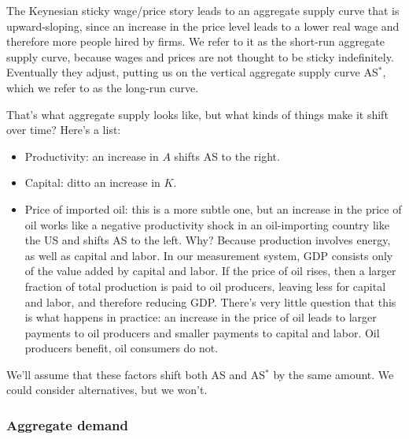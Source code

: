\documentclass[letterpaper,12pt]{article}
\begin{document}


The Keynesian sticky wage/price story leads to 
an aggregate supply curve that is upward-sloping, 
since an increase in the price level leads to a lower
real wage and therefore more people hired by firms.    
We refer to it as the short-run aggregate supply curve, 
because wages and prices are not thought to be sticky indefinitely.
Eventually they adjust, putting us on the vertical aggregate 
supply curve AS$^*$, 
which we refer to as the long-run curve. 


That's what aggregate supply looks like, 
but what kinds of things make it shift over time?  
Here's a list:   
%
\begin{itemize}
\item Productivity:  an increase in $A$ shifts AS to the right.  
\item Capital:  ditto an increase in $K$. 
\item Price of imported oil:  this is a more subtle one, but
an increase in the price of oil works like a negative productivity shock 
in an oil-importing country like the US and shifts AS to the left.  
Why?  Because production involves energy, as well as capital and labor.
In our measurement system, GDP consists only of the value added by capital
and labor.
If the price of oil rises, then a larger fraction of total production
is paid to oil producers, leaving less for capital and labor, 
and therefore reducing GDP.  
There's very little question that this is what happens in practice:
an increase in the price of oil leads to larger payments to oil producers
and smaller payments to capital and labor.  
Oil producers benefit, oil consumers do not. 
\end{itemize}
%
We'll assume that these factors shift both AS and AS$^*$ 
by the same amount.  
We could consider alternatives, but we won't.  


\subsubsection*{Aggregate demand} 
\end{document}
